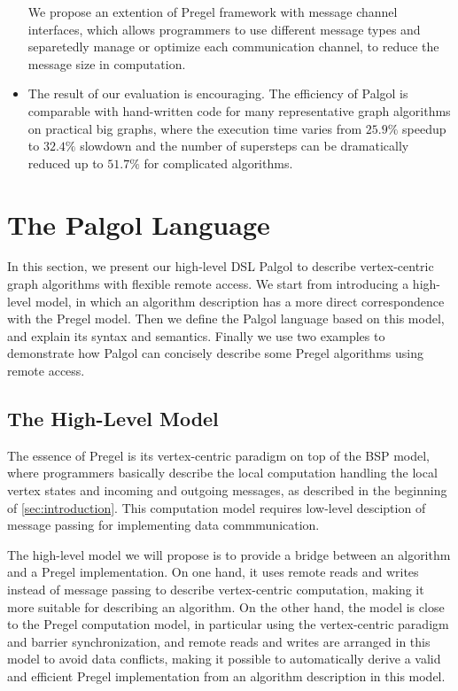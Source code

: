\documentclass{sokendai_thesis} %
\begin{document}
\begin{itemize}
 We propose an extention of Pregel framework with message channel interfaces, which allows programmers to use different message types and separetedly manage or optimize each communication channel, to reduce the message size in computation.
\item
 The result of our evaluation is encouraging.
 The efficiency of Palgol is comparable with hand-written code for many representative graph algorithms on practical big graphs, where the execution time varies from $25.9\%$ speedup to $32.4\%$ slowdown and the number of supersteps can be dramatically reduced up to $51.7\%$ for complicated algorithms.
\end{itemize}

\chapter{The Palgol Language}

In this section, we present our high-level DSL Palgol to describe vertex-centric graph algorithms with flexible remote access.
We start from introducing a high-level model, in which an algorithm description has a more direct correspondence with the Pregel model.
Then we define the Palgol language based on this model, and explain its syntax and semantics.
Finally we use two examples to demonstrate how Palgol can concisely describe some Pregel algorithms using remote access.

\section{The High-Level Model}

The essence of Pregel is its vertex-centric paradigm on top of the BSP model, where programmers basically describe the local computation handling the local vertex states and incoming and outgoing messages, as described in the beginning of \autoref{sec:introduction}.
This computation model requires low-level desciption of message passing for implementing data commmunication.

The high-level model we will propose is to provide a bridge between an algorithm and a Pregel implementation.
On one hand, it uses remote reads and writes instead of message passing to describe vertex-centric computation, making it more suitable for describing an algorithm.
On the other hand, the model is close to the Pregel computation model, in particular using the vertex-centric paradigm and barrier synchronization, and remote reads and writes are arranged in this model to avoid data conflicts, making it possible to automatically derive a valid and efficient Pregel implementation from an algorithm description in this model.
\end{document}
